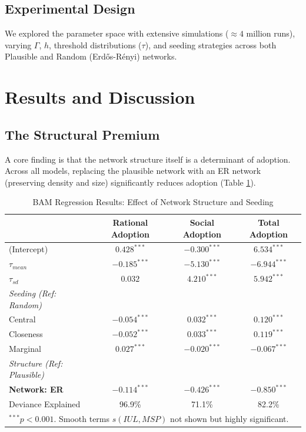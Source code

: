 \documentclass[11pt, a4paper]{article}
\begin{document}
\subsection{Experimental Design}
We explored the parameter space with extensive simulations ($\approx 4$ million runs), varying $\Gamma$, $h$, threshold distributions ($\tau$), and seeding strategies across both Plausible and Random (Erdős-Rényi) networks.

\section{Results and Discussion}
\label{sec:results}

\subsection{The Structural Premium}
A core finding is that the network structure itself is a determinant of adoption. Across all models, replacing the plausible network with an ER network (preserving density and size) significantly reduces adoption (Table \ref{tab:regressions}).

\begin{table}[H]
\centering
\caption{BAM Regression Results: Effect of Network Structure and Seeding}
\label{tab:regressions}
\begin{tabular}{lccc}
\toprule
 & \textbf{Rational Adoption} & \textbf{Social Adoption} & \textbf{Total Adoption} \\
\midrule
(Intercept) & $0.428^{***}$ & $-0.300^{***}$ & $6.534^{***}$ \\
$\tau_{mean}$ & $-0.185^{***}$ & $-5.130^{***}$ & $-6.944^{***}$ \\
$\tau_{sd}$ & $0.032$ & $4.210^{***}$ & $5.942^{***}$ \\
\midrule
\textit{Seeding (Ref: Random)} & & & \\
Central & $-0.054^{***}$ & $0.032^{***}$ & $0.120^{***}$ \\
Closeness & $-0.052^{***}$ & $0.033^{***}$ & $0.119^{***}$ \\
Marginal & $0.027^{***}$ & $-0.020^{***}$ & $-0.067^{***}$ \\
\midrule
\textit{Structure (Ref: Plausible)} & & & \\
\textbf{Network: ER} & $\mathbf{-0.114^{***}}$ & $\mathbf{-0.426^{***}}$ & $\mathbf{-0.850^{***}}$ \\
\midrule
Deviance Explained & 96.9\% & 71.1\% & 82.2\% \\
\bottomrule
\multicolumn{4}{l}{\footnotesize $^{***}p<0.001$. Smooth terms $s(IUL, MSP)$ not shown but highly significant.}
\end{tabular}
\end{table}
\end{document}
